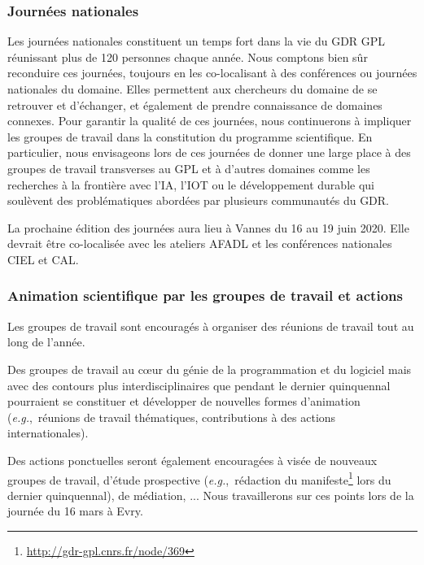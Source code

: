 \documentclass[11pt]{article}
\newcommand{\eg}[0]{\emph{e.g.},~}
\begin{document}
\subsubsection{Journées nationales}

Les journées nationales constituent un temps fort dans la vie du
GDR GPL réunissant plus de 120 personnes chaque année. Nous comptons bien sûr reconduire ces journées, toujours en les co-localisant à des conférences ou journées nationales du domaine.
Elles permettent aux chercheurs du domaine de se retrouver et d'échanger, et
également de prendre connaissance de domaines connexes. 
Pour garantir la qualité de ces journées, nous continuerons à impliquer les groupes de travail dans la constitution du programme scientifique. En particulier, nous envisageons lors de ces journées de donner une large place à des groupes de travail transverses au GPL et à d'autres domaines comme les recherches à la frontière avec l'IA, l'IOT ou le développement durable qui soulèvent des problématiques abordées par plusieurs communautés du GDR. 

La prochaine édition des journées aura lieu à Vannes du 16 au 19 juin 2020. Elle devrait être co-localisée avec les ateliers AFADL et les conférences nationales CIEL et CAL.


\subsubsection{Animation scientifique par les groupes de travail et actions}

Les groupes de travail sont encouragés à organiser des réunions de travail
tout au long de l'année. 

Des groupes de travail au c\oe{}ur du génie de la programmation et du logiciel mais avec des contours plus interdisciplinaires que pendant le dernier quinquennal pourraient se constituer et développer de nouvelles formes d'animation (\eg réunions de travail thématiques, contributions à des actions internationales). 

Des actions ponctuelles seront également encouragées à visée de nouveaux groupes de travail, d'étude prospective (\eg rédaction du manifeste\footnote{\url{http://gdr-gpl.cnrs.fr/node/369}} lors du dernier quinquennal), de médiation, ... 
Nous travaillerons sur ces points lors de la journée du 16 mars à Evry. 
\end{document}
